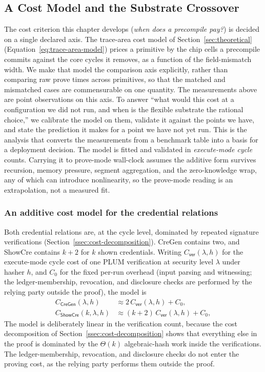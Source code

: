 \subsection{A Cost Model and the Substrate Crossover}\label{ssec:costmodel}
The cost criterion this chapter develops (\emph{when does a precompile pay?}) is decided on a single declared axis. The trace-area cost model of Section~\ref{sec:theoretical} (Equation~\eqref{eq:trace-area-model}) prices a primitive by the chip cells a precompile commits against the core cycles it removes, as a function of the field-mismatch width. We make that model the comparison axis explicitly, rather than comparing raw prove times across primitives, so that the matched and mismatched cases are commensurable on one quantity. The measurements above are point observations on this axis. To answer ``what would this cost at a configuration we did not run, and when is the flexible substrate the rational choice,'' we calibrate the model on them, validate it against the points we have, and state the prediction it makes for a point we have not yet run. This is the analysis that converts the measurements from a benchmark table into a basis for a deployment decision. The model is fitted and validated in \emph{execute-mode cycle} counts. Carrying it to prove-mode wall-clock assumes the additive form survives recursion, memory pressure, segment aggregation, and the zero-knowledge wrap, any of which can introduce nonlinearity, so the prove-mode reading is an extrapolation, not a measured fit.

\subsubsection{An additive cost model for the credential relations}
Both credential relations are, at the cycle level, dominated by repeated signature verifications (Section~\ref{ssec:cost-decomposition}). CreGen contains two, and ShowCre contains $k+2$ for $k$ shown credentials. Writing $C_{\mathsf{ver}}(\lambda,h)$ for the execute-mode cycle cost of one PLUM verification at security level $\lambda$ under hasher $h$, and $C_0$ for the fixed per-run overhead (input parsing and witnessing; the ledger-membership, revocation, and disclosure checks are performed by the relying party outside the proof), the model is
\begin{align}
  C_{\mathsf{CreGen}}(\lambda,h) &\approx 2\,C_{\mathsf{ver}}(\lambda,h) + C_0,
  \label{eq:cost-cregen}\\
  C_{\mathsf{ShowCre}}(k,\lambda,h) &\approx (k+2)\,C_{\mathsf{ver}}(\lambda,h) + C_0,
  \label{eq:cost-showcre}
\end{align}
The model is deliberately linear in the verification count, because the cost decomposition of Section~\ref{ssec:cost-decomposition} shows that everything else in the proof is dominated by the $\Theta(k)$ algebraic-hash work inside the verifications. The ledger-membership, revocation, and disclosure checks do not enter the proving cost, as the relying party performs them outside the proof.


